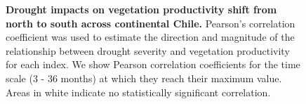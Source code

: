\documentclass[
  sn-nature,
  numbered]{sn-jnl}
\begin{document}
\begin{figure}[!ht]


\caption{\label{fig-map_cor_r_indices}\textbf{Drought impacts on
vegetation productivity shift from north to south across continental
Chile.} Pearson's correlation coefficient was used to estimate the
direction and magnitude of the relationship between drought severity and
vegetation productivity for each index. We show Pearson correlation
coefficients for the time scale (3 - 36 months) at which they reach
their maximum value. Areas in white indicate no statistically
significant correlation.}

\end{figure}%
\end{document}
